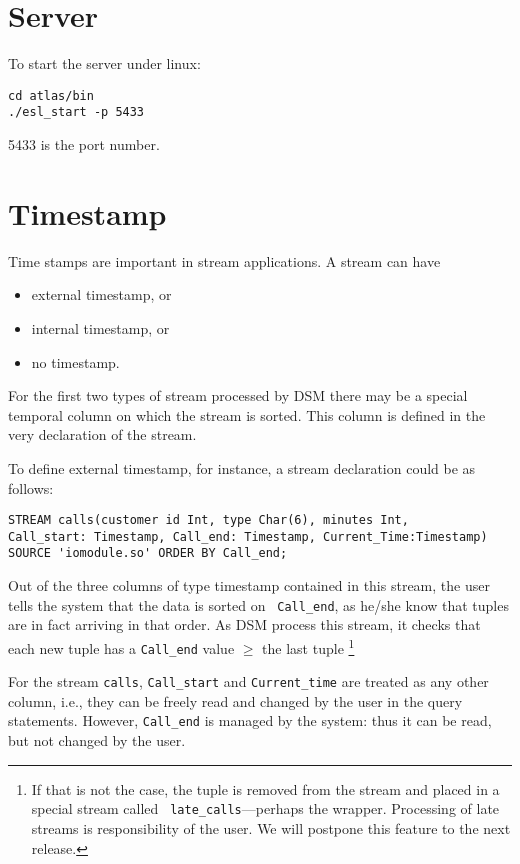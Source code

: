 \documentclass[10pt]{report}
\begin{document}


\chapter{Server}
To start the server under linux:
\begin{verbatim}
cd atlas/bin
./esl_start -p 5433
\end{verbatim}
5433 is the port number.


\chapter{Timestamp}
Time stamps are important in stream applications.  A stream can have 
\begin{itemize}
\item external timestamp, or
\item internal timestamp, or
\item no timestamp.
\end{itemize}
For the first two types of stream
processed by DSM there may be a special temporal column on which the stream is sorted. This column is defined in the
very declaration of the stream. 

To define external timestamp, for instance, a stream declaration could be
as follows:

\begin{verbatim}
STREAM calls(customer id Int, type Char(6), minutes Int,
Call_start: Timestamp, Call_end: Timestamp, Current_Time:Timestamp)
SOURCE 'iomodule.so' ORDER BY Call_end;
\end{verbatim}


Out of the three columns of type timestamp contained in this
stream, the user tells the system that the data is sorted on {\tt
Call\_end}, as he/she know that tuples are in fact arriving in
that order. As DSM process this stream, it checks that each new
tuple has a {\tt Call\_end} value $\geq$ the last tuple
\footnote{If that is not the case, the tuple is removed from the
stream and placed in a special stream called {\tt
late\_calls}---perhaps the wrapper. Processing of late
streams is responsibility of the user.  We will postpone this feature to the next release.}

For the stream {\tt calls},  {\tt Call\_start} and {\tt Current\_time}
are treated as any other column, i.e., they can be freely read and changed by the user
in the query statements.
However, {\tt Call\_end} is managed by the system: thus it can
be read, but not changed by the user.
\end{document}

